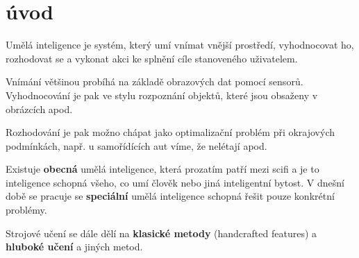 \chapter{úvod}

Umělá inteligence je systém, který umí vnímat vnější prostředí, vyhodnocovat ho, rozhodovat se a vykonat akci ke splnění cíle stanoveného uživatelem.

Vnímání většinou probíhá na základě obrazových dat pomocí sensorů. Vyhodnocování je pak ve stylu rozpoznání objektů, které jsou obsaženy v obrázcích apod.

Rozhodování je pak možno chápat jako optimalizační problém při okrajových podmínkách, např. u samořídících aut víme, že nelétají apod. 

Existuje \textbf{obecná} umělá inteligence, která prozatím patří mezi scifi a je to inteligence schopná všeho, co umí člověk nebo jiná inteligentní bytost. V dnešní době se pracuje se \textbf{speciální} umělá inteligence schopná řešit pouze konkrétní problémy.

Strojové učení se dále dělí na \textbf{klasické metody} (handcrafted features) a \textbf{hluboké učení} a jiných metod. 
